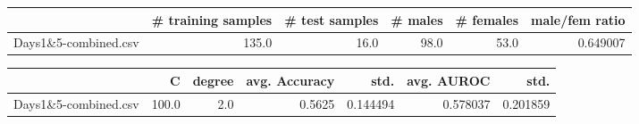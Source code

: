 \begin{tabular}{lrrrrr}
\hline
{} &  \# training samples &  \# test samples &  \# males &  \# females &  male/fem ratio \\
\hline
Days1\&5-combined.csv &               135.0 &            16.0 &     98.0 &       53.0 &        0.649007 \\
\hline
\end{tabular}
\begin{tabular}{lrrrrrr}
\hline
{} &      C &  degree &  avg. Accuracy &      std. &  avg. AUROC &      std. \\
\hline
Days1\&5-combined.csv &  100.0 &     2.0 &         0.5625 &  0.144494 &    0.578037 &  0.201859 \\
\hline
\end{tabular}
